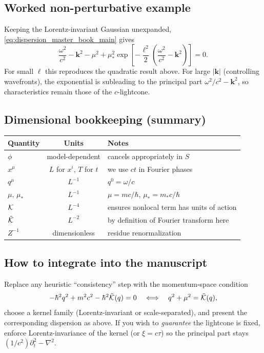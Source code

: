 \subsection{Worked non-perturbative example}
Keeping the Lorentz-invariant Gaussian unexpanded, \eqref{eq:dispersion_master_book_main} gives
\begin{equation}
\frac{\omega^2}{c^2}-\mathbf{k}^2-\mu^2
+\mu_*^2\exp\!\left[-\frac{\ell^2}{2}\left(\frac{\omega^2}{c^2}-\mathbf{k}^2\right)\right]=0.
\end{equation}
For small \(\ell\) this reproduces the quadratic result above. For large \(|\mathbf{k}|\) (controlling wavefronts), the exponential is subleading to the principal part \(\omega^2/c^2-\mathbf{k}^2\), so characteristics remain those of the \(c\)-lightcone.

\subsection{Dimensional bookkeeping (summary)}
\begin{center}
\begin{tabular}{lcl}
Quantity & Units & Notes \\\hline
\(\phi\) & model-dependent & cancels appropriately in \(S\) \\
\(x^\mu\) & \(L\) for \(x^i\), \(T\) for \(t\) & we use \(ct\) in Fourier phases \\
\(q^\mu\) & \(L^{-1}\) & \(q^0=\omega/c\) \\
\(\mu,\,\mu_*\) & \(L^{-1}\) & \(\mu=mc/\hbar\), \(\mu_*=m_*c/\hbar\) \\
\(\mathcal{K}\) & \(L^{-4}\) & ensures nonlocal term has units of action \\
\(\tilde{\mathcal{K}}\) & \(L^{-2}\) & by definition of Fourier transform here \\
\(Z^{-1}\) & dimensionless & residue renormalization \\
\end{tabular}
\end{center}

\subsection{How to integrate into the manuscript}
Replace any heuristic ``consistency'' step with the momentum-space condition
\begin{equation}
-\hbar^2 q^2+m^2c^2-\hbar^2\tilde{\mathcal{K}}(q)=0
\quad\Longleftrightarrow\quad
q^2+\mu^2=\tilde{\mathcal{K}}(q),
\end{equation}
choose a kernel family (Lorentz-invariant or scale-separated), and present the corresponding dispersion as above. If you wish to \emph{guarantee} the lightcone is fixed, enforce Lorentz-invariance of the kernel (or \(\xi=c\tau\)) so the principal part stays \((1/c^{2})\partial_t^2-\nabla^2\).

